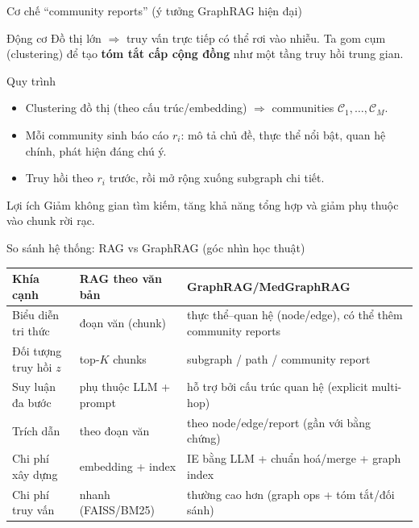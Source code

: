 \documentclass[aspectratio=169,10pt]{beamer}
\newcommand{\C}{\mathcal{C}}
\begin{document}
\begin{frame}{Cơ chế ``community reports'' (ý tưởng GraphRAG hiện đại)}
\small
\begin{block}{Động cơ}
Đồ thị lớn \(\Rightarrow\) truy vấn trực tiếp có thể rơi vào nhiễu. Ta gom cụm (clustering) để tạo \textbf{tóm tắt cấp cộng đồng} như một tầng truy hồi trung gian.
\end{block}

\begin{block}{Quy trình}
\begin{itemize}
  \item Clustering đồ thị (theo cấu trúc/embedding) \(\Rightarrow\) communities \(\C_1,\dots,\C_M\).
  \item Mỗi community sinh báo cáo \(r_i\): mô tả chủ đề, thực thể nổi bật, quan hệ chính, phát hiện đáng chú ý.
  \item Truy hồi theo \(r_i\) trước, rồi mở rộng xuống subgraph chi tiết.
\end{itemize}
\end{block}

\begin{block}{Lợi ích}
Giảm không gian tìm kiếm, tăng khả năng tổng hợp và giảm phụ thuộc vào chunk rời rạc.
\end{block}
\end{frame}

\begin{frame}{So sánh hệ thống: RAG vs GraphRAG (góc nhìn học thuật)}
\small
\begin{tabular}{@{}p{3.1cm}p{4.3cm}p{5.9cm}@{}}
\toprule
\textbf{Khía cạnh} & \textbf{RAG theo văn bản} & \textbf{GraphRAG/MedGraphRAG} \\
\midrule
Biểu diễn tri thức & đoạn văn (chunk) & thực thể--quan hệ (node/edge), có thể thêm community reports \\
Đối tượng truy hồi \(z\) & top-\(K\) chunks & subgraph / path / community report \\
Suy luận đa bước & phụ thuộc LLM + prompt & hỗ trợ bởi cấu trúc quan hệ (explicit multi-hop) \\
Trích dẫn & theo đoạn văn & theo node/edge/report (gần với bằng chứng) \\
Chi phí xây dựng & embedding + index & IE bằng LLM + chuẩn hoá/merge + graph index \\
Chi phí truy vấn & nhanh (FAISS/BM25) & thường cao hơn (graph ops + tóm tắt/đối sánh) \\
\bottomrule
\end{tabular}
\end{frame}
\end{document}
